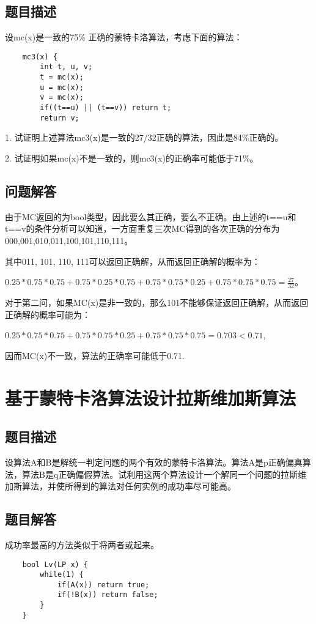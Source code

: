 \documentclass[UTF8]{ctexart}
\begin{document}
    \subsection{题目描述}
    设mc(x)是一致的75\% 正确的蒙特卡洛算法，考虑下面的算法：

    \begin{small}
    \begin{lstlisting}
    mc3(x) {
        int t, u, v;
        t = mc(x);
        u = mc(x);
        v = mc(x);
        if((t==u) || (t==v)) return t;
        return v;
    \end{lstlisting}
    \end{small}

    1. 试证明上述算法mc3(x)是一致的27/32正确的算法，因此是84\%正确的。

    2. 试证明如果mc(x)不是一致的，则mc3(x)的正确率可能低于71\%。
    \subsection{问题解答}
    由于MC返回的为bool类型，因此要么其正确，要么不正确。由上述的t==u和t==v的条件分析可以知道，一方面重复三次MC得到的各次正确的分布为000,001,010,011,100,101,110,111。
    
    其中011, 101, 110, 111可以返回正确解，从而返回正确解的概率为：
    
    $0.25*0.75*0.75 + 0.75*0.25*0.75 + 0.75*0.75*0.25 + 0.75*0.75*0.75 = \frac{27}{32}$。
    
    对于第二问，如果MC(x)是非一致的，那么101不能够保证返回正确解，从而返回正确解的概率可能为：
    
    $0.25*0.75*0.75 + 0.75*0.75*0.25 + 0.75*0.75*0.75 = 0.703 < 0.71$,
    
    因而MC(x)不一致，算法的正确率可能低于0.71.
    
    \section{基于蒙特卡洛算法设计拉斯维加斯算法}
    \subsection{题目描述}
    设算法A和B是解统一判定问题的两个有效的蒙特卡洛算法。算法A是p正确偏真算法，算法B是q正确偏假算法。试利用这两个算法设计一个解同一个问题的拉斯维加斯算法，并使所得到的算法对任何实例的成功率尽可能高。
    \subsection{题目解答}
    成功率最高的方法类似于将两者或起来。
    
    \begin{small}
    \begin{lstlisting}
    bool Lv(LP x) {
        while(1) {
            if(A(x)) return true;
            if(!B(x)) return false;
        }
    }
    \end{lstlisting}
    \end{small}
\end{document}
